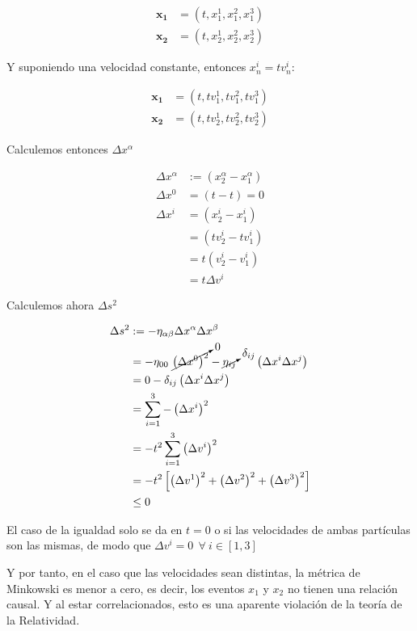 \begin{align*}
    \mathbf{x_1} &= \left(t,x^1_1,x^2_1,x^3_1\right)\\
    \mathbf{x_2} &= \left(t,x^1_2,x^2_2,x^3_2\right)
\end{align*}

Y suponiendo una velocidad constante, entonces $x^i_n=tv^i_n$:

\begin{align}
    \mathbf{x_1} &= \left(t,tv^1_1,tv^2_1,tv^3_1\right)\\
    \mathbf{x_2} &= \left(t,tv^1_2,tv^2_2,tv^3_2\right)
\end{align}

Calculemos entonces $\Delta x^\alpha$

\begin{align*}
    \Delta x^\alpha 
        &:= \left(x^\alpha_2-x^\alpha_1\right)\\
    \Delta x^0
        &= \left(t-t\right)=0\\
    \Delta x^i
        &= \left(x^i_2-x^i_1\right)\\
        &= \left(tv^i_2-tv^i_1\right)\\
        &= t\left(v^i_2-v^i_1\right)\\
        &= t\Delta v^i
\end{align*}

Calculemos ahora $\Delta s^2$

\begin{align*}
    \Delta s^2 
        &:= -\eta_{\alpha\beta}\Delta x^\alpha \Delta x^\beta\\
        &=-\eta_{00}~\cancelto{0}{\left(\Delta x^0\right)^2}-\cancelto{\delta_{ij}}{\eta_{ij}}~~~~~\left(\Delta x^i\Delta x^j\right)\\
        &=0-\delta_{ij}\left(\Delta x^i\Delta x^j \right)\\
        &=\sum_{i=1}^3-\left(\Delta x^i\right)^2\\
        &=-t^2\sum_{i=1}^3 \left(\Delta v^i\right)^2\\
        &=-t^2\left[\left(\Delta v^1\right)^2+\left(\Delta v^2\right)^2+\left(\Delta v^3\right)^2\right]\\
        &\leq0
\end{align*}

El caso de la igualdad solo se da en $t=0$ o si las velocidades de ambas partículas son las mismas, de modo que $\Delta v^i = 0~~\forall~i\in[1,3]$

Y por tanto, en el caso que las velocidades sean distintas, la métrica de Minkowski es menor a cero, es decir, los eventos $x_1$ y $x_2$ no tienen una relación causal. Y al estar correlacionados, esto es una aparente violación de la teoría de la Relatividad.

